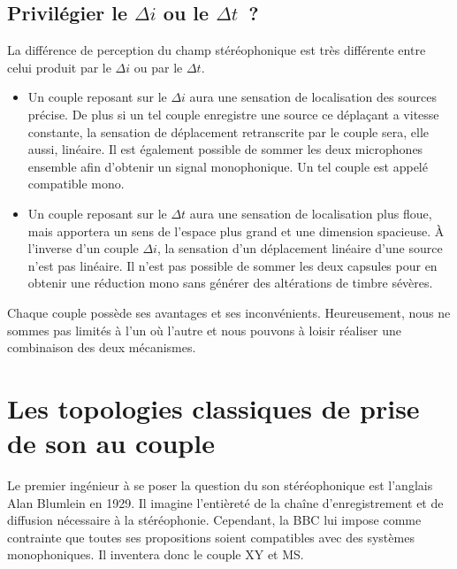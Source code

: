 \documentclass[
]{book}
\providecommand{\tightlist}{%
  \setlength{\itemsep}{0pt}\setlength{\parskip}{0pt}}
\begin{document}
\hypertarget{priviluxe9gier-le-delta-i-ou-le-delta-t}{%
\subsection{\texorpdfstring{Privilégier le \(\Delta i\) ou le \(\Delta t\)~?}{Privilégier le \textbackslash Delta i ou le \textbackslash Delta t~?}}\label{priviluxe9gier-le-delta-i-ou-le-delta-t}}

La différence de perception du champ stéréophonique est très différente entre celui produit par le \(\Delta i\) ou par le \(\Delta t\).

\begin{itemize}
\tightlist
\item
  Un couple reposant sur le \(\Delta i\) aura une sensation de localisation des sources précise. De plus si un tel couple enregistre une source ce déplaçant a vitesse constante, la sensation de déplacement retranscrite par le couple sera, elle aussi, linéaire. Il est également possible de sommer les deux microphones ensemble afin d'obtenir un signal monophonique. Un tel couple est appelé compatible mono.
\item
  Un couple reposant sur le \(\Delta t\) aura une sensation de localisation plus floue, mais apportera un sens de l'espace plus grand et une dimension spacieuse. À l'inverse d'un couple \(\Delta i\), la sensation d'un déplacement linéaire d'une source n'est pas linéaire. Il n'est pas possible de sommer les deux capsules pour en obtenir une réduction mono sans générer des altérations de timbre sévères.
\end{itemize}

Chaque couple possède ses avantages et ses inconvénients. Heureusement, nous ne sommes pas limités à l'un où l'autre et nous pouvons à loisir réaliser une combinaison des deux mécanismes.

\hypertarget{les-topologies-classiques-de-prise-de-son-au-couple}{%
\section{Les topologies classiques de prise de son au couple}\label{les-topologies-classiques-de-prise-de-son-au-couple}}

Le premier ingénieur à se poser la question du son stéréophonique est l'anglais Alan Blumlein en 1929. Il imagine l'entièreté de la chaîne d'enregistrement et de diffusion nécessaire à la stéréophonie. Cependant, la BBC lui impose comme contrainte que toutes ses propositions soient compatibles avec des systèmes monophoniques. Il inventera donc le couple XY et MS.
\end{document}
